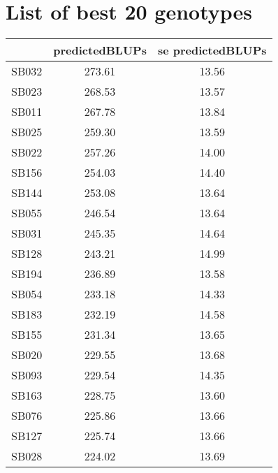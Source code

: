 \documentclass[a4paper,11pt]{article}\usepackage[]{graphicx}\usepackage[]{color}
\begin{document}
\section{List of best 20 genotypes}
\begin{table}[ht]
\begin{flushleft}
\begin{tabular}{lcc}
  \hline
 & predictedBLUPs & se predictedBLUPs \\ 
  \hline
SB032 & 273.61 & 13.56 \\ 
  SB023 & 268.53 & 13.57 \\ 
  SB011 & 267.78 & 13.84 \\ 
  SB025 & 259.30 & 13.59 \\ 
  SB022 & 257.26 & 14.00 \\ 
  SB156 & 254.03 & 14.40 \\ 
  SB144 & 253.08 & 13.64 \\ 
  SB055 & 246.54 & 13.64 \\ 
  SB031 & 245.35 & 14.64 \\ 
  SB128 & 243.21 & 14.99 \\ 
  SB194 & 236.89 & 13.58 \\ 
  SB054 & 233.18 & 14.33 \\ 
  SB183 & 232.19 & 14.58 \\ 
  SB155 & 231.34 & 13.65 \\ 
  SB020 & 229.55 & 13.68 \\ 
  SB093 & 229.54 & 14.35 \\ 
  SB163 & 228.75 & 13.60 \\ 
  SB076 & 225.86 & 13.66 \\ 
  SB127 & 225.74 & 13.66 \\ 
  SB028 & 224.02 & 13.69 \\ 
   \hline
\end{tabular}
\label{bestTab}
\end{flushleft}
\end{table}

\end{document}
